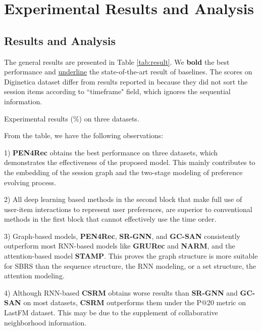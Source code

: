 \documentclass[runningheads]{llncs}
\begin{document}
\section{Experimental Results and Analysis} \label{sec:results}



\subsection{Results and Analysis}

The general results are presented in Table \ref{tab:result}.
We \textbf{bold} the best performance and \underline{underline} the state-of-the-art result of baselines.
The scores on Diginetica dataset differ from results reported in \cite{DBLP:conf/cikm/LiRCRLM17,DBLP:conf/kdd/LiuZMZ18} because they did not sort the session items according to ``timeframe" field, which ignores the sequential information. 


\begin{table}[t]
  \centering 
  \caption{Experimental results (\%) on three datasets.  }
  \resizebox{0.71\columnwidth}{!}{}    
  \label{tab:result}
\end{table}

From the table, we have the following observations: 

1) \textbf{PEN4Rec} obtains the best performance on three datasets, which demonstrates the effectiveness of the proposed model. 
This mainly contributes to the embedding of the session graph and the two-stage modeling of preference evolving process.

2) All deep learning based methods in the second block that make full use of user-item interactions to represent user preferences, are superior to conventional methods in the first block that cannot effectively use the time order.

3) Graph-based models, \textbf{PEN4Rec}, \textbf{SR-GNN}, and \textbf{GC-SAN} consistently outperform most RNN-based models like \textbf{GRURec} and \textbf{NARM}, and the attention-based model \textbf{STAMP}. This proves the graph structure is more suitable for SBRS than the sequence structure, the RNN modeling, or a set structure, the attention modeling.

4) Although RNN-based \textbf{CSRM} obtains worse results than \textbf{SR-GNN} and \textbf{GC-SAN} on most datasets, \textbf{CSRM} outperforms them under the P@20 metric on LastFM dataset. This may be due to the supplement of collaborative neighborhood information.
\end{document}
